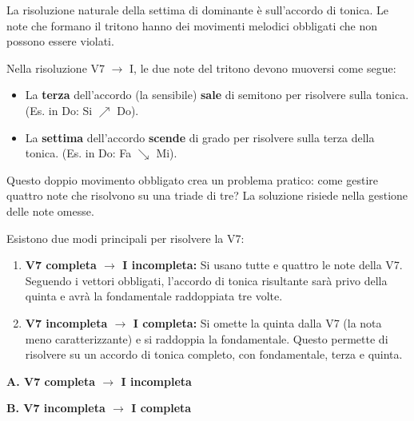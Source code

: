 La risoluzione naturale della settima di dominante è sull'accordo di tonica. Le note che formano il tritono hanno dei movimenti melodici obbligati che non possono essere violati.

\begin{regola}
	\label{reg:vettori_obbligati}
	Nella risoluzione V7 $\rightarrow$ I, le due note del tritono devono muoversi come segue:
	\begin{itemize}
		\item La \textbf{terza} dell'accordo (la sensibile) \textbf{sale} di semitono per risolvere sulla tonica. (Es. in Do: Si $\nearrow$ Do).
		\item La \textbf{settima} dell'accordo \textbf{scende} di grado per risolvere sulla terza della tonica. (Es. in Do: Fa $\searrow$ Mi).
	\end{itemize}
\end{regola}

Questo doppio movimento obbligato crea un problema pratico: come gestire quattro note che risolvono su una triade di tre? La soluzione risiede nella gestione delle note omesse.

\begin{definizione}
	\label{def:v7_completa_incompleta}
	Esistono due modi principali per risolvere la V7:
	\begin{enumerate}
		\item \textbf{V7 completa $\rightarrow$ I incompleta:} Si usano tutte e quattro le note della V7. Seguendo i vettori obbligati, l'accordo di tonica risultante sarà privo della quinta e avrà la fondamentale raddoppiata tre volte.
		\item \textbf{V7 incompleta $\rightarrow$ I completa:} Si omette la quinta dalla V7 (la nota meno caratterizzante) e si raddoppia la fondamentale. Questo permette di risolvere su un accordo di tonica completo, con fondamentale, terza e quinta.
	\end{enumerate}
\end{definizione}

\begin{esempio}
	\label{ex:due_risoluzioni_v7}
	\textbf{A. V7 completa $\rightarrow$ I incompleta}
	
	\vspace{1cm}
	\textbf{B. V7 incompleta $\rightarrow$ I completa}
\end{esempio}

